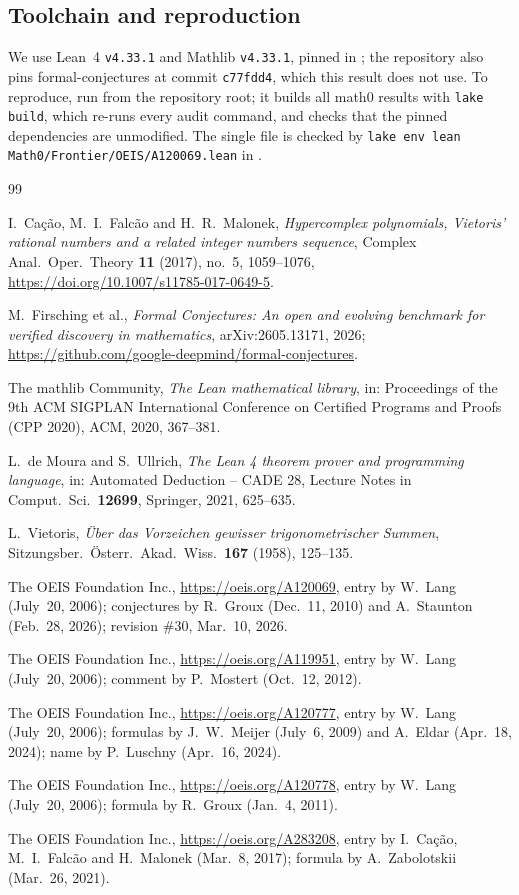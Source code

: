 \documentclass[11pt]{amsart}
\theoremstyle{plain}
\theoremstyle{definition}
\begin{document}
\subsection*{Toolchain and reproduction}
We use Lean~4 \cite{Lean4} \texttt{v4.33.1} and Mathlib \cite{Mathlib} \texttt{v4.33.1}, pinned in ; the repository also pins formal-conjectures \cite{FC} at commit \texttt{c77fdd4}, which this result does not use. To reproduce, run  from the repository root; it builds all math0 results with \texttt{lake build}, which re-runs every audit command, and checks that the pinned dependencies are unmodified. The single file is checked by \texttt{lake env lean Math0/Frontier/OEIS/A120069.lean} in .

{\small
\begin{thebibliography}{99}

I.~Cação, M.~I.~Falcão and H.~R.~Malonek, \emph{Hypercomplex polynomials, Vietoris' rational numbers and a related integer numbers sequence}, Complex Anal.\ Oper.\ Theory \textbf{11} (2017), no.~5, 1059--1076, \url{https://doi.org/10.1007/s11785-017-0649-5}.

M.~Firsching et al., \emph{Formal Conjectures: An open and evolving benchmark for verified discovery in mathematics}, arXiv:2605.13171, 2026; \url{https://github.com/google-deepmind/formal-conjectures}.

The mathlib Community, \emph{The Lean mathematical library}, in: Proceedings of the 9th ACM SIGPLAN International Conference on Certified Programs and Proofs (CPP 2020), ACM, 2020, 367--381.

L.~de Moura and S.~Ullrich, \emph{The Lean 4 theorem prover and programming language}, in: Automated Deduction -- CADE 28, Lecture Notes in Comput.\ Sci.\ \textbf{12699}, Springer, 2021, 625--635.

L.~Vietoris, \emph{Über das Vorzeichen gewisser trigonometrischer Summen}, Sitzungsber.\ Österr.\ Akad.\ Wiss.\ \textbf{167} (1958), 125--135.

The OEIS Foundation Inc., \url{https://oeis.org/A120069}, entry by W.~Lang (July~20, 2006); conjectures by R.~Groux (Dec.~11, 2010) and A.~Staunton (Feb.~28, 2026); revision \#30, Mar.~10, 2026.

The OEIS Foundation Inc., \url{https://oeis.org/A119951}, entry by W.~Lang (July~20, 2006); comment by P.~Mostert (Oct.~12, 2012).

The OEIS Foundation Inc., \url{https://oeis.org/A120777}, entry by W.~Lang (July~20, 2006); formulas by J.~W.~Meijer (July~6, 2009) and A.~Eldar (Apr.~18, 2024); name by P.~Luschny (Apr.~16, 2024).

The OEIS Foundation Inc., \url{https://oeis.org/A120778}, entry by W.~Lang (July~20, 2006); formula by R.~Groux (Jan.~4, 2011).

The OEIS Foundation Inc., \url{https://oeis.org/A283208}, entry by I.~Cação, M.~I.~Falcão and H.~Malonek (Mar.~8, 2017); formula by A.~Zabolotskii (Mar.~26, 2021).

\end{thebibliography}
}
\end{document}
